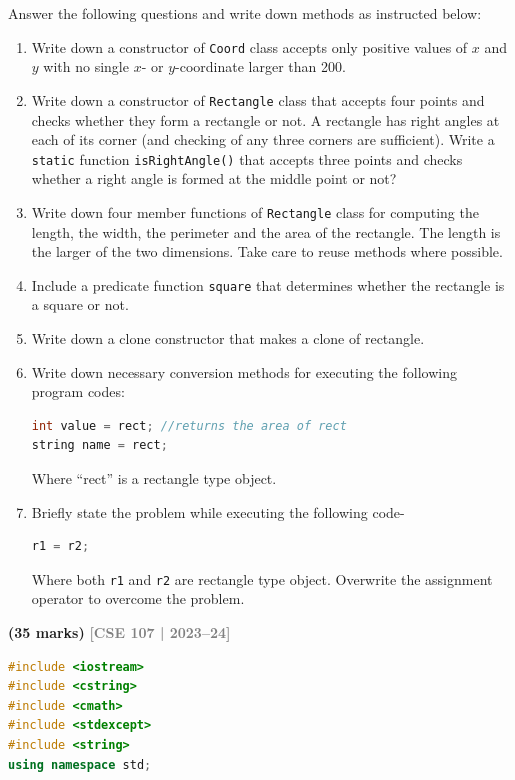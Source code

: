 \documentclass[12pt,a3paper]{article}
\newcommand{\yr}[1]{\hfill\textcolor{gray}{\small\textbf{[#1]}}}
\newcommand{\mk}[1]{\textcolor{orange!70!black}{\small\textbf{(#1 marks)}}}
\begin{document}
\begin{enumerate}
Answer the following questions and write down methods as instructed below:
\begin{enumerate}
    \item Write down a constructor of \texttt{Coord} class accepts only positive values of $x$ and $y$ with no single $x$- or $y$-coordinate larger than 200.
    \item Write down a constructor of \texttt{Rectangle} class that accepts four points and checks whether they form a rectangle or not. A rectangle has right angles at each of its corner (and checking of any three corners are sufficient). Write a \texttt{static} function \texttt{isRightAngle()} that accepts three points and checks whether a right angle is formed at the middle point or not?
    \item Write down four member functions of \texttt{Rectangle} class for computing the length, the width, the perimeter and the area of the rectangle. The length is the larger of the two dimensions. Take care to reuse methods where possible.
    \item Include a predicate function \texttt{square} that determines whether the rectangle is a square or not.
    \item Write down a clone constructor that makes a clone of rectangle.
    \item Write down necessary conversion methods for executing the following program codes:
\begin{lstlisting}[language=C++]
int value = rect; //returns the area of rect
string name = rect;
\end{lstlisting}
    Where ``rect'' is a rectangle type object.
    \item Briefly state the problem while executing the following code-
\begin{lstlisting}[language=C++]
r1 = r2;
\end{lstlisting}
    Where both \texttt{r1} and \texttt{r2} are rectangle type object. Overwrite the assignment operator to overcome the problem.
\end{enumerate} \mk{35}
\yr{CSE 107 | 2023--24}

\begin{tcolorbox}[enhanced,breakable,ansbox,
  colback=cF!4,colframe=cF,boxrule=0.8pt,arc=5pt,
  title={\textbf{Answer --- Coord and Rectangle Classes}},
  fonttitle=\bfseries\color{white},colbacktitle=cF]
\begin{lstlisting}[language=C++]
#include <iostream>
#include <cstring>
#include <cmath>
#include <stdexcept>
#include <string>
using namespace std;


\end{lstlisting}
\end{tcolorbox}
\end{enumerate}
\end{document}
